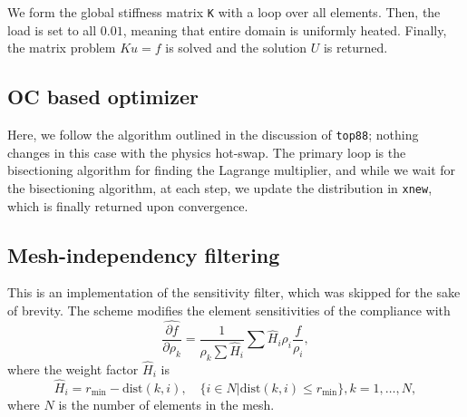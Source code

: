We form the global stiffness matrix \texttt{K} with a loop over all elements. Then, the load is set to all $0.01$, meaning that entire domain is
uniformly heated. Finally, the matrix problem $Ku = f$ is solved and the solution $U$ is returned.

\subsection{OC based optimizer}

Here, we follow the algorithm outlined in the discussion of \texttt{top88}; nothing changes in this case with the physics hot-swap. The primary
loop is the bisectioning algorithm for finding the Lagrange multiplier, and while we wait for the bisectioning algorithm, at each step, we update
the distribution in \texttt{xnew}, which is finally returned upon convergence.

\subsection{Mesh-independency filtering}

This is an implementation of the sensitivity filter, which was skipped for the sake of brevity. The scheme modifies the element sensitivities
of the compliance with\cite{bendsoe_sigmund_topopt}
\begin{equation}
    \hat{\frac{\partial f}{\partial \rho_k}} = \frac{1}{\rho_k \sum \hat{H}_i} \sum \hat{H}_i \rho_i \frac{f}{\rho_i},
\end{equation}
where the weight factor $\hat{H}_i$ is
\begin{equation}
    \hat{H}_i = r_\text{min} - \text{dist}(k,i), \quad \{i \in N | \text{dist}(k,i) \leq r_\text{min}\}, k = 1, \ldots, N,
\end{equation}
where $N$ is the number of elements in the mesh.




